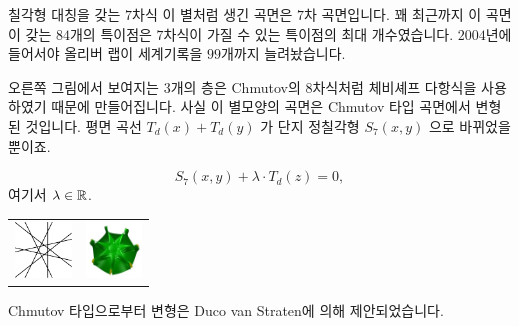 \begin{surferPage}{칠각형 대칭을 갖는 $7$차식}
    이 별처럼 생긴 곡면은 $7$차 곡면입니다. 꽤 최근까지 이 곡면이 갖는 $84$개의 특이점은 $7$차식이 가질 수 있는 특이점의 최대 개수였습니다. $2004$년에 들어서야 올리버 랩이 세계기록을 $99$개까지 늘려놨습니다.
  
  
오른쪽 그림에서 보여지는 $3$개의 층은 Chmutov의 $8$차식처럼 체비셰프 다항식을 사용하였기 때문에 만들어집니다. 사실 이 별모양의 곡면은 Chmutov 타입 곡면에서 변형된 것입니다. 평면 곡선 $T_d(x)+T_d(y)$ 가 단지 정칠각형 $S_7(x,y)$ 으로 바뀌었을 뿐이죠. 
   
   \[S_7(x,y) + \lambda \cdot T_d(z) = 0,\]
    여기서 $\lambda\in{\mathbb R}$. 
    \vspace*{-0.3em}
    \begin{center}
      \begin{tabular}{c@{\qquad}c}
        \includegraphics[height=1.5cm]{./../../common/images/labsseptic1.pdf}
        &
        \includegraphics[height=1.5cm]{./../../common/images/septic_7eck_von_oben}
      \end{tabular}
    \end{center}
    \vspace*{-0.3em}   
Chmutov 타입으로부터 변형은 Duco van Straten에 의해 제안되었습니다.
\end{surferPage}
